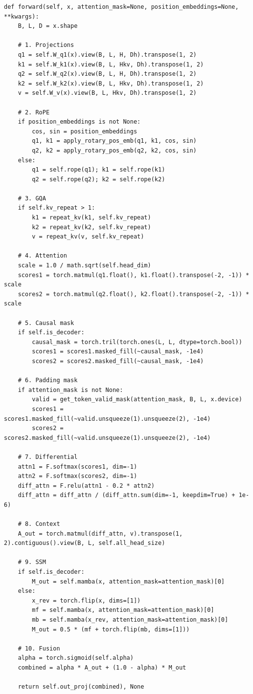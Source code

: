 \begin{lstlisting}
def forward(self, x, attention_mask=None, position_embeddings=None, **kwargs):
    B, L, D = x.shape
    
    # 1. Projections
    q1 = self.W_q1(x).view(B, L, H, Dh).transpose(1, 2)
    k1 = self.W_k1(x).view(B, L, Hkv, Dh).transpose(1, 2)
    q2 = self.W_q2(x).view(B, L, H, Dh).transpose(1, 2)
    k2 = self.W_k2(x).view(B, L, Hkv, Dh).transpose(1, 2)
    v = self.W_v(x).view(B, L, Hkv, Dh).transpose(1, 2)
    
    # 2. RoPE
    if position_embeddings is not None:
        cos, sin = position_embeddings
        q1, k1 = apply_rotary_pos_emb(q1, k1, cos, sin)
        q2, k2 = apply_rotary_pos_emb(q2, k2, cos, sin)
    else:
        q1 = self.rope(q1); k1 = self.rope(k1)
        q2 = self.rope(q2); k2 = self.rope(k2)
    
    # 3. GQA
    if self.kv_repeat > 1:
        k1 = repeat_kv(k1, self.kv_repeat)
        k2 = repeat_kv(k2, self.kv_repeat)
        v = repeat_kv(v, self.kv_repeat)
    
    # 4. Attention
    scale = 1.0 / math.sqrt(self.head_dim)
    scores1 = torch.matmul(q1.float(), k1.float().transpose(-2, -1)) * scale
    scores2 = torch.matmul(q2.float(), k2.float().transpose(-2, -1)) * scale
    
    # 5. Causal mask
    if self.is_decoder:
        causal_mask = torch.tril(torch.ones(L, L, dtype=torch.bool))
        scores1 = scores1.masked_fill(~causal_mask, -1e4)
        scores2 = scores2.masked_fill(~causal_mask, -1e4)
    
    # 6. Padding mask
    if attention_mask is not None:
        valid = get_token_valid_mask(attention_mask, B, L, x.device)
        scores1 = scores1.masked_fill(~valid.unsqueeze(1).unsqueeze(2), -1e4)
        scores2 = scores2.masked_fill(~valid.unsqueeze(1).unsqueeze(2), -1e4)
    
    # 7. Differential
    attn1 = F.softmax(scores1, dim=-1)
    attn2 = F.softmax(scores2, dim=-1)
    diff_attn = F.relu(attn1 - 0.2 * attn2)
    diff_attn = diff_attn / (diff_attn.sum(dim=-1, keepdim=True) + 1e-6)
    
    # 8. Context
    A_out = torch.matmul(diff_attn, v).transpose(1, 2).contiguous().view(B, L, self.all_head_size)
    
    # 9. SSM
    if self.is_decoder:
        M_out = self.mamba(x, attention_mask=attention_mask)[0]
    else:
        x_rev = torch.flip(x, dims=[1])
        mf = self.mamba(x, attention_mask=attention_mask)[0]
        mb = self.mamba(x_rev, attention_mask=attention_mask)[0]
        M_out = 0.5 * (mf + torch.flip(mb, dims=[1]))
    
    # 10. Fusion
    alpha = torch.sigmoid(self.alpha)
    combined = alpha * A_out + (1.0 - alpha) * M_out
    
    return self.out_proj(combined), None
\end{lstlisting}

